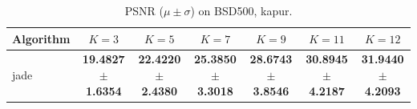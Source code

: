 \begin{table}[htbp]
\centering
\caption{PSNR ($\mu \pm \sigma$) on BSD500, kapur.}
\label{tab:exp1-kapur-psnr}
\begin{tabular}{lcccccc}
\toprule
Algorithm & $K=3$ & $K=5$ & $K=7$ & $K=9$ & $K=11$ & $K=12$ \\
\midrule
jade & \textbf{19.4827 $\pm$ 1.6354} & \textbf{22.4220 $\pm$ 2.4380} & \textbf{25.3850 $\pm$ 3.3018} & \textbf{28.6743 $\pm$ 3.8546} & \textbf{30.8945 $\pm$ 4.2187} & \textbf{31.9440 $\pm$ 4.2093} \\
\bottomrule
\end{tabular}
\end{table}